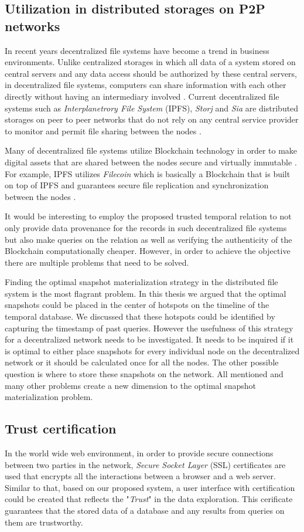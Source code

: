 		\subsection {Utilization in distributed storages on P2P networks}
			In recent years decentralized file systems have become a trend in business environments. Unlike centralized storages in which all data of a system stored on central servers and any data access should be authorized by these central servers, in decentralized file systems, computers can share information with each other directly without having an intermediary involved \cite{koonce2016thewild}. Current decentralized file systems such as {\it Interplanetrory File System} (IPFS), {\it Storj} and {\it Sia} are distributed storages on peer to peer networks that do not rely on any central service provider to monitor and permit file sharing between the nodes \cite{wang2018ablockchain}. 

			Many of decentralized file systems utilize Blockchain technology in order to make digital assets that are shared between the nodes secure and virtually immutable \cite{wang2018ablockchain}. For example, IPFS utilizes {\it Filecoin} which is basically a Blockchain that is built on top of IPFS and guarantees secure file replication and synchronization between the nodes \cite{vatsalya2018marinehull}.

			It would be interesting to employ the proposed trusted temporal relation to not only provide data provenance for the records in such decentralized file systems but also make queries on the relation as well as verifying the authenticity of the Blockchain computationally cheaper. However, in order to achieve the objective there are multiple problems that need to be solved.

			Finding the optimal snapshot materialization strategy in the distributed file system is the most flagrant problem. In this thesis we argued that the optimal snapshots could be placed in the center of hotspots on the timeline of the temporal database. We discussed that these hotspots could be identified by capturing the timestamp of past queries. However the usefulness of this strategy for a decentralized network needs to be investigated. It needs to be inquired if it is optimal to either place snapshots for every individual node on the decentralized network or it should be calculated once for all the nodes. The other possible question is where to store these snapshots on the network. All mentioned and many other problems create a new dimension to the optimal snapshot materialization problem.

		\subsection {Trust certification}
			In the world wide web environment, in order to provide secure connections between two parties in the network, {\it Secure Socket Layer} (SSL) certificates are used that encrypts all the interactions between a browser and a web server. Similar to that, based on our proposed system, a user interface with certification could be created that reflects the "{\it Trust}" in the data exploration. This cerificate guarantees that the stored data of a database and any results from queries on them are trustworthy. 
